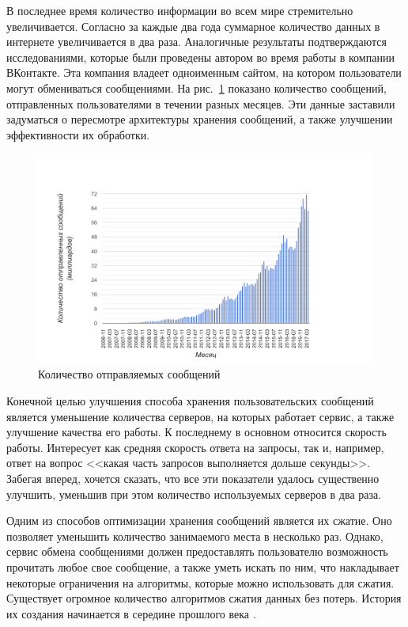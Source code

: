 
\startprefacepage

В последнее время количество информации во всем мире стремительно увеличивается. 
Согласно \cite{two-times} за каждые два года суммарное количество данных в интернете увеличивается в два раза. 
Аналогичные результаты подтверждаются исследованиями, которые были проведены автором во время работы в компании ВКонтакте. 
Эта компания владеет одноименным сайтом, на котором пользователи могут обмениваться сообщениями. 
На рис.~\ref{fig1} показано количество сообщений, отправленных пользователями в течении разных месяцев. 
Эти данные заставили задуматься о пересмотре архитектуры хранения сообщений, а также улучшении эффективности их обработки.

\begin{figure}[h!]
  \includegraphics[width=\linewidth]{pics/msgs-num.png}
  \caption{Количество отправляемых сообщений}
  \label{fig1}
\end{figure}

Конечной целью улучшения способа хранения пользовательских сообщений является уменьшение количества серверов,
 на которых работает сервис, а также улучшение качества его работы. К последнему в основном относится скорость 
 работы. Интересует как средняя скорость ответа на запросы, так и, например, ответ на вопрос <<какая часть 
 запросов выполняется дольше секунды>>. Забегая вперед, хочется сказать, что все эти показатели удалось 
 существенно улучшить, уменьшив при этом количество используемых серверов в два раза.

Одним из способов оптимизации хранения сообщений является их сжатие. Оно позволяет уменьшить количество 
занимаемого места в несколько раз. Однако, сервис обмена сообщениями должен предоставлять пользователю возможность
 прочитать любое свое сообщение, а также уметь искать по ним, что накладывает некоторые ограничения на алгоритмы, которые можно использовать для сжатия.
Существует огромное количество алгоритмов сжатия данных без потерь. История их создания начинается в 
середине прошлого века \cite{kudryashov}. 

